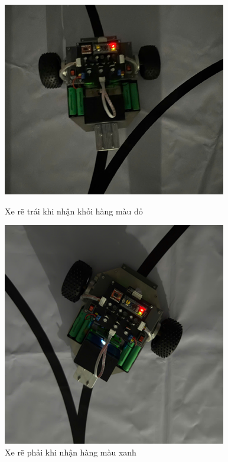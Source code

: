 \begin{figure}[H]
                    \begin{minipage}{0.5\textwidth}
                         \centering
                         \includegraphics[width=\linewidth]{pictures/chapter8/turn_left.png}
                         \caption{Xe rẽ trái khi nhận khối hàng màu đỏ}
                         \label{fig:chapter8:1.2 - 2}
                    \end{minipage}\hfill
                    \begin{minipage}{0.42\textwidth}
                         \centering
                         \includegraphics[width=\linewidth]{pictures/chapter8/turn_right.png}
                         \caption{Xe rẽ phải khi nhận hàng màu xanh}
                         \label{fig:chapter8:1.2 - 3}
                    \end{minipage}
               \end{figure}
